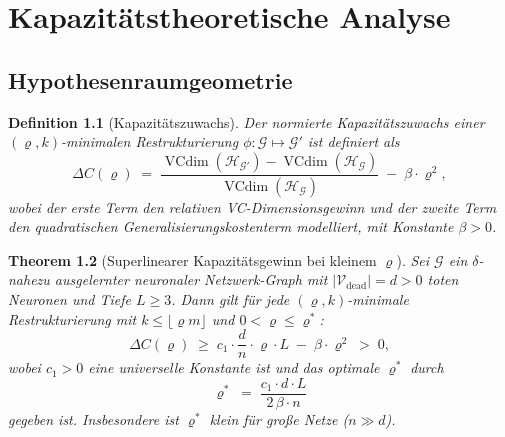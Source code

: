 ﻿\documentclass[12pt, a4paper, openany]{report}
\newtheorem{theorem}{Theorem}[chapter]
\newtheorem{definition}[theorem]{Definition}
\newcommand{\calG}{\mathcal{G}}
\newcommand{\calH}{\mathcal{H}}
\newcommand{\calV}{\mathcal{V}}
\DeclareMathOperator{\VC}{VCdim}
\begin{document}
\chapter{Kapazitätstheoretische Analyse}
\label{sec:capacity}

\section{Hypothesenraumgeometrie}

\begin{definition}[Kapazitätszuwachs]
\label{def:capacity}
Der \emph{normierte Kapazitätszuwachs} einer $(\varrho, k)$-minimalen
Restrukturierung $\phi : \calG \mapsto \calG'$ ist definiert als
\begin{equation}
  \label{eq:deltaC}
  \Delta C(\varrho) \;=\;
  \frac{\VC(\calH_{\calG'}) - \VC(\calH_{\calG})}{\VC(\calH_{\calG})}
  \;-\; \beta \cdot \varrho^2,
\end{equation}
wobei der erste Term den relativen VC-Dimensionsgewinn und der zweite Term
den quadratischen Generalisierungskostenterm modelliert, mit Konstante
$\beta > 0$.
\end{definition}

\begin{theorem}[Superlinearer Kapazitätsgewinn bei kleinem $\varrho$]
\label{thm:main}
Sei $\calG$ ein $\delta$-nahezu ausgelernter neuronaler Netzwerk-Graph mit
$|\calV_{\mathrm{dead}}| = d > 0$ toten Neuronen und Tiefe $L \geq 3$.
Dann gilt für jede $(\varrho, k)$-minimale Restrukturierung mit
$k \leq \lfloor\varrho m\rfloor$ und $0 < \varrho \leq \varrho^*$:
\begin{equation}
  \label{eq:main_thm}
  \Delta C(\varrho)
  \;\geq\;
  c_1 \cdot \frac{d}{n} \cdot \varrho \cdot L
  \;-\; \beta \cdot \varrho^2
  \;>\; 0,
\end{equation}
wobei $c_1 > 0$ eine universelle Konstante ist und das optimale
$\varrho^*$ durch
\begin{equation}
  \label{eq:rho_opt}
  \varrho^*
  \;=\;
  \frac{c_1 \cdot d \cdot L}{2\,\beta \cdot n}
\end{equation}
gegeben ist.  Insbesondere ist $\varrho^*$ \emph{klein} für große Netze ($n \gg d$).
\end{theorem}
\end{document}
